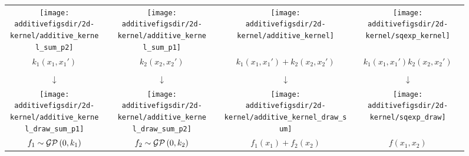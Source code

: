 \begin{figure}
\centering
\begin{tabular}{ccccc|c}
\hspace{-0.2cm}\texttt{[image: \\additivefigsdir/2d-kernel/additive\_kernel\_sum\_p2]} 
& \hspace{-0.4cm} \raisebox{1cm}{+} \hspace{-0.4cm} & 
\texttt{[image: \\additivefigsdir/2d-kernel/additive\_kernel\_sum\_p1]} 
& \hspace{-0.4cm} \raisebox{1cm}{=} \hspace{-0.4cm} & 
\texttt{[image: \\additivefigsdir/2d-kernel/additive\_kernel]} &
\texttt{[image: \\additivefigsdir/2d-kernel/sqexp\_kernel]} \\
$k_1(x_1, x_1')$ & & $k_2(x_2, x_2')$ & & $k_1(x_1,x_1') + k_2(x_2,x_2')$ &$k_1(x_1,x_1')k_2(x_2,x_2')$ \\
&&&&& \\
\large $\downarrow$ & & \large $\downarrow$ & & \large $\downarrow$ & \large $\downarrow$  \\
\hspace{-0.2cm}\texttt{[image: \\additivefigsdir/2d-kernel/additive\_kernel\_draw\_sum\_p1]}
& \hspace{-0.4cm} \raisebox{1cm}{+} \hspace{-0.4cm} & 
\texttt{[image: \\additivefigsdir/2d-kernel/additive\_kernel\_draw\_sum\_p2]}
& \hspace{-0.4cm} \raisebox{1cm}{=} \hspace{-0.4cm} &
\texttt{[image: \\additivefigsdir/2d-kernel/additive\_kernel\_draw\_sum]} &
\texttt{[image: \\additivefigsdir/2d-kernel/sqexp\_draw]} \\
$f_1 \sim \mathcal{GP}\left(0, k_1\right)$ & & $f_2 \sim \mathcal{GP}\left(0, k_2\right)$ & & $f_1(x_1) + f_2(x_2)$ & $f(x_1, x_2)$ \\

\end{tabular}
\end{figure}
